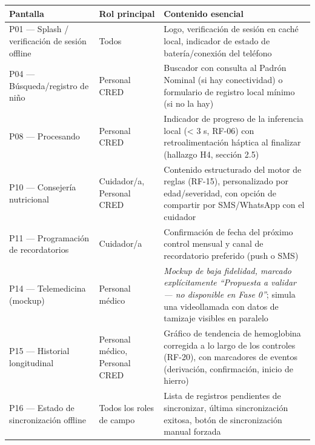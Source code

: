 \documentclass[11pt,a4paper]{article}
\begin{document}
{\small
\begin{longtable}[]{@{}
  >{\raggedright\arraybackslash}p{}
  >{\raggedright\arraybackslash}p{}
  >{\raggedright\arraybackslash}p{}@{}}
\toprule\noalign{}
\begin{minipage}[b]{\linewidth}\raggedright
Pantalla
\end{minipage} & \begin{minipage}[b]{\linewidth}\raggedright
Rol principal
\end{minipage} & \begin{minipage}[b]{\linewidth}\raggedright
Contenido esencial
\end{minipage} \\
\midrule\noalign{}
\endhead
\bottomrule\noalign{}
\endlastfoot
P01 --- Splash / verificación de sesión offline & Todos & Logo, verificación de sesión en caché local, indicador de estado de batería/conexión del teléfono \\
P04 --- Búsqueda/registro de niño & Personal CRED & Buscador con consulta al Padrón Nominal (si hay conectividad) o formulario de registro local mínimo (si no la hay) \\
P08 --- Procesando & Personal CRED & Indicador de progreso de la inferencia local (\textless{} 3 s, RF-06) con retroalimentación háptica al finalizar (hallazgo H4, sección 2.5) \\
P10 --- Consejería nutricional & Cuidador/a, Personal CRED & Contenido estructurado del motor de reglas (RF-15), personalizado por edad/severidad, con opción de compartir por SMS/WhatsApp con el cuidador \\
P11 --- Programación de recordatorios & Cuidador/a & Confirmación de fecha del próximo control mensual y canal de recordatorio preferido (push o SMS) \\
P14 --- Telemedicina (mockup) & Personal médico & \emph{Mockup de baja fidelidad, marcado explícitamente ``Propuesta a validar --- no disponible en Fase 0''}; simula una videollamada con datos de tamizaje visibles en paralelo \\
P15 --- Historial longitudinal & Personal médico, Personal CRED & Gráfico de tendencia de hemoglobina corregida a lo largo de los controles (RF-20), con marcadores de eventos (derivación, confirmación, inicio de hierro) \\
P16 --- Estado de sincronización offline & Todos los roles de campo & Lista de registros pendientes de sincronizar, última sincronización exitosa, botón de sincronización manual forzada \\
\end{longtable}
}
\end{document}
